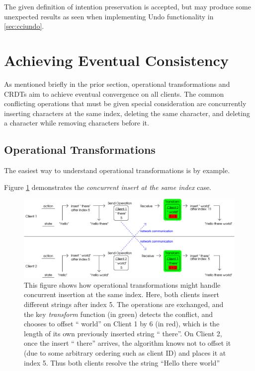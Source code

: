 \documentclass[12pt,a4paper,twoside,openright]{report}
\begin{document}
	The given definition of intention preservation is accepted, but may produce some unexpected results as seen when implementing Undo functionality in \cref{sec:cciundo}.
	

\section{Achieving Eventual Consistency}

	As mentioned briefly in the prior section, operational transformations and CRDTs aim to achieve eventual convergence on all clients. The common conflicting operations that must be given special consideration are concurrently inserting characters at the same index, deleting the same character, and deleting a character while removing characters before it.

	\subsection{Operational Transformations}
	
	The easiest way to understand operational transformations is by example.
	
	Figure \ref{fig:ot1} demonstrates the \textit{concurrent insert at the same index} case.
	
	\begin{figure}[H]
	\centering
	\includegraphics[width=1\linewidth]{figs/ot1.eps}
	\caption[Operational Transformations -- concurrent insertion]{This figure shows how operational transformations might handle concurrent insertion at the same index. Here, both clients insert different strings after index 5. The operations are exchanged, and the key \textit{transform} function (in green) detects the conflict, and chooses to offset `` world'' on Client 1 by 6 (in red), which is the length of its own previously inserted string `` there''. On Client 2, once the insert `` there'' arrives, the algorithm knows not to offset it (due to some arbitrary ordering such as client ID) and places it at index 5. Thus both clients resolve the string ``Hello there world''}
	\label{fig:ot1}
	\end{figure}
	
\end{document}
